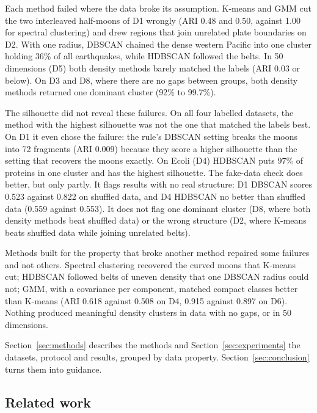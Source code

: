 \begin{description}\itemsep1pt
\item[RQ1.] Each method failed where the data broke its assumption. K-means and GMM cut the two
interleaved half-moons of D1 wrongly (ARI 0.48 and 0.50, against 1.00 for spectral clustering) and drew
regions that join unrelated plate boundaries on D2. With one radius, DBSCAN chained the dense western
Pacific into one cluster holding 36\% of all earthquakes, while HDBSCAN followed the belts. In 50
dimensions (D5) both density methods barely matched the labels (ARI 0.03 or below). On D3 and D8, where
there are no gaps between groups, both density methods returned one dominant cluster (92\% to 99.7\%).
\item[RQ2.] The silhouette did not reveal these failures. On all four labelled datasets, the method with
the highest silhouette was not the one that matched the labels best. On D1 it even chose the failure:
the rule's DBSCAN setting breaks the moons into 72 fragments (ARI 0.009) because they score a higher
silhouette than the setting that recovers the moons exactly. On Ecoli (D4) HDBSCAN puts 97\% of proteins
in one cluster and has the highest silhouette. The fake-data check does better, but only partly. It
flags results with no real structure: D1 DBSCAN scores 0.523 against 0.822 on shuffled data, and D4
HDBSCAN no better than shuffled data (0.559 against 0.553). It does not flag one dominant cluster (D8,
where both density methods beat shuffled data) or the wrong structure (D2, where K-means beats shuffled
data while joining unrelated belts).
\item[RQ3.] Methods built for the property that broke another method repaired some failures and not
others. Spectral clustering recovered the curved moons that K-means cut; HDBSCAN followed belts of uneven
density that one DBSCAN radius could not; GMM, with a covariance per component, matched compact classes
better than K-means (ARI 0.618 against 0.508 on D4, 0.915 against 0.897 on D6). Nothing produced
meaningful density clusters in data with no gaps, or in 50 dimensions.
\end{description}

Section~\ref{sec:methods} describes the methods and Section~\ref{sec:experiments} the datasets,
protocol and results, grouped by data property. Section~\ref{sec:conclusion} turns them into guidance.

\subsection{Related work}
